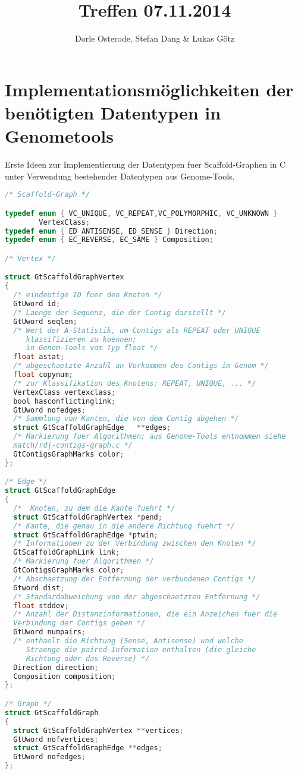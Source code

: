\documentclass[a4paper,10pt,parskip]{scrartcl}
\title{Treffen 07.11.2014}
\author{Dorle Osterode, Stefan Dang \& Lukas Götz}
\begin{document}
\maketitle{}

\section{Implementationsmöglichkeiten der benötigten Datentypen in Genometools}

Erste Ideen zur Implementierung der Datentypen fuer Scaffold-Graphen in C unter
Verwendung bestehender Datentypen aus Genome-Tools.

\begin{lstlisting}[language=C]
/* Scaffold-Graph */

typedef enum { VC_UNIQUE, VC_REPEAT,VC_POLYMORPHIC, VC_UNKNOWN }
	 	VertexClass;
typedef enum { ED_ANTISENSE, ED_SENSE } Direction;
typedef enum { EC_REVERSE, EC_SAME } Composition;

/* Vertex */

struct GtScaffoldGraphVertex
{
  /* eindeutige ID fuer den Knoten */
  GtUword id;
  /* Laenge der Sequenz, die der Contig darstellt */
  GtUword seqlen;
  /* Wert der A-Statistik, um Contigs als REPEAT oder UNIQUE
     klassifizieren zu koennen;
     in Genom-Tools vom Typ float */
  float astat;
  /* abgeschaetzte Anzahl an Vorkommen des Contigs im Genom */
  float copynum;
  /* zur Klassifikation des Knotens: REPEAT, UNIQUE, ... */
  VertexClass vertexclass;
  bool hasconflictinglink;
  GtUword nofedges;
  /* Sammlung von Kanten, die von dem Contig abgehen */
  struct GtScaffoldGraphEdge   **edges;
  /* Markierung fuer Algorithmen; aus Genome-Tools entnommen siehe
  match/rdj-contigs-graph.c */
  GtContigsGraphMarks color;
};

/* Edge */
struct GtScaffoldGraphEdge
{
  /*  Knoten, zu dem die Kante fuehrt */
  struct GtScaffoldGraphVertex *pend;
  /* Kante, die genau in die andere Richtung fuehrt */
  struct GtScaffoldGraphEdge *ptwin;
  /* Informationen zu der Verbindung zwischen den Knoten */
  GtScaffoldGraphLink link;
  /* Markierung fuer Algorithmen */
  GtContigsGraphMarks color;
  /* Abschaetzung der Entfernung der verbundenen Contigs */
  Gtword dist;
  /* Standardabweichung von der abgeschaetzten Entfernung */
  float stddev;
  /* Anzahl der Distanzinformationen, die ein Anzeichen fuer die
  Verbindung der Contigs geben */
  GtUword numpairs;
  /* enthaelt die Richtung (Sense, Antisense) und welche
     Straenge die paired-Information enthalten (die gleiche
     Richtung oder das Reverse) */
  Direction direction;
  Composition composition;
};

/* Graph */
struct GtScaffoldGraph
{
  struct GtScaffoldGraphVertex **vertices;
  GtUword nofvertices;
  struct GtScaffoldGraphEdge **edges;
  GtUword nofedges;
};
\end{lstlisting}
\end{document}
